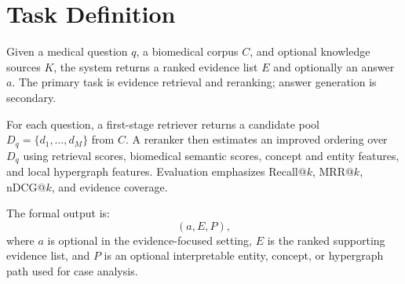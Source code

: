 \section{Task Definition}

Given a medical question $q$, a biomedical corpus $C$, and optional knowledge sources $K$, the system returns a ranked evidence list $E$ and optionally an answer $a$. The primary task is evidence retrieval and reranking; answer generation is secondary.

For each question, a first-stage retriever returns a candidate pool $D_q = \{d_1,\ldots,d_M\}$ from $C$. A reranker then estimates an improved ordering over $D_q$ using retrieval scores, biomedical semantic scores, concept and entity features, and local hypergraph features. Evaluation emphasizes Recall@$k$, MRR@$k$, nDCG@$k$, and evidence coverage.

The formal output is:
\[
  (a, E, P),
\]
where $a$ is optional in the evidence-focused setting, $E$ is the ranked supporting evidence list, and $P$ is an optional interpretable entity, concept, or hypergraph path used for case analysis.
